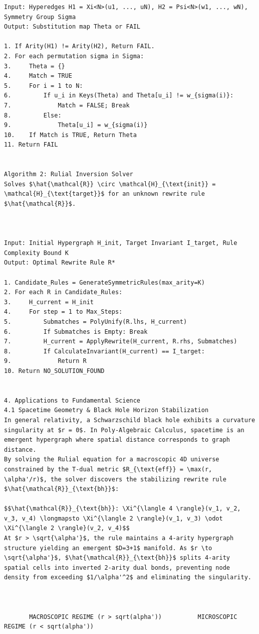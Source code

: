 \documentclass[11pt,a4paper]{article}
\begin{document}
\begin{lstlisting}[language={}, caption={}, basicstyle=\ttfamily\footnotesize, breaklines=true]
Input: Hyperedges H1 = Xi<N>(u1, ..., uN), H2 = Psi<N>(w1, ..., wN), Symmetry Group Sigma
Output: Substitution map Theta or FAIL

1. If Arity(H1) != Arity(H2), Return FAIL.
2. For each permutation sigma in Sigma:
3.     Theta = {}
4.     Match = TRUE
5.     For i = 1 to N:
6.         If u_i in Keys(Theta) and Theta[u_i] != w_{sigma(i)}:
7.             Match = FALSE; Break
8.         Else:
9.             Theta[u_i] = w_{sigma(i)}
10.    If Match is TRUE, Return Theta
11. Return FAIL


Algorithm 2: Rulial Inversion Solver
Solves $\hat{\mathcal{R}} \circ \mathcal{H}_{\text{init}} = \mathcal{H}_{\text{target}}$ for an unknown rewrite rule $\hat{\mathcal{R}}$.



Input: Initial Hypergraph H_init, Target Invariant I_target, Rule Complexity Bound K
Output: Optimal Rewrite Rule R*

1. Candidate_Rules = GenerateSymmetricRules(max_arity=K)
2. For each R in Candidate_Rules:
3.     H_current = H_init
4.     For step = 1 to Max_Steps:
5.         Submatches = PolyUnify(R.lhs, H_current)
6.         If Submatches is Empty: Break
7.         H_current = ApplyRewrite(H_current, R.rhs, Submatches)
8.         If CalculateInvariant(H_current) == I_target:
9.             Return R
10. Return NO_SOLUTION_FOUND


4. Applications to Fundamental Science
4.1 Spacetime Geometry & Black Hole Horizon Stabilization
In general relativity, a Schwarzschild black hole exhibits a curvature singularity at $r = 0$. In Poly-Algebraic Calculus, spacetime is an emergent hypergraph where spatial distance corresponds to graph distance.
By solving the Rulial equation for a macroscopic 4D universe constrained by the T-dual metric $R_{\text{eff}} = \max(r, \alpha'/r)$, the solver discovers the stabilizing rewrite rule $\hat{\mathcal{R}}_{\text{bh}}$:

$$\hat{\mathcal{R}}_{\text{bh}}: \Xi^{\langle 4 \rangle}(v_1, v_2, v_3, v_4) \longmapsto \Xi^{\langle 2 \rangle}(v_1, v_3) \odot \Xi^{\langle 2 \rangle}(v_2, v_4)$$
At $r > \sqrt{\alpha'}$, the rule maintains a 4-arity hypergraph structure yielding an emergent $D=3+1$ manifold. As $r \to \sqrt{\alpha'}$, $\hat{\mathcal{R}}_{\text{bh}}$ splits 4-arity spatial cells into inverted 2-arity dual bonds, preventing node density from exceeding $1/\alpha'^2$ and eliminating the singularity.



       MACROSCOPIC REGIME (r > sqrt(alpha'))          MICROSCOPIC REGIME (r < sqrt(alpha'))
       

\end{lstlisting}
\end{document}
